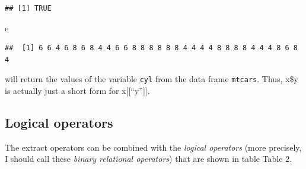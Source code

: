 \documentclass[
  12pt,
  oneside]{book}
\newenvironment{Shaded}{\begin{snugshade}}{\end{snugshade}}
\newcommand{\NormalTok}[1]{#1}
\begin{document}
\begin{verbatim}
## [1] TRUE
\end{verbatim}

\begin{Shaded}
\begin{Highlighting}[]
\NormalTok{e}
\end{Highlighting}
\end{Shaded}

\begin{verbatim}
##  [1] 6 6 4 6 8 6 8 4 4 6 6 8 8 8 8 8 8 4 4 4 4 8 8 8 8 4 4 4 8 6 8 4
\end{verbatim}

will return the values of the variable \texttt{cyl} from the data frame \texttt{mtcars}.
Thus, x\$y is actually just a short form for x{[}{[}``y''{]}{]}.

\hypertarget{logical-operators}{%
\subsection{Logical operators}\label{logical-operators}}

The extract operators can be combined with the \emph{logical operators} (more precisely, I should call these \emph{binary relational operators}) that are shown in table Table 2.
\end{document}
